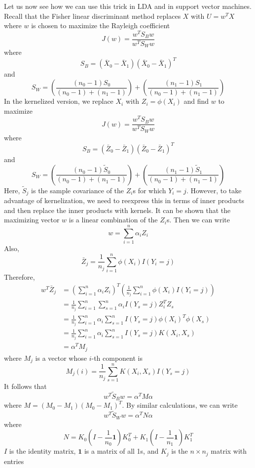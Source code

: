 Let us now see how we can use this trick in LDA and in support vector
machines.
Recall that the Fisher linear discriminant method replaces \(X\) with
\(U = w^T X\) where \(w\) is chosen to maximize the Rayleigh coefficient
\[
J(w) = \frac{w^T S_B w}{w^T S_W w}
\]
where
\[
S_B = (\bar{X}_{0} - \bar{X}_{1})(\bar{X}_{0} - \bar{X}_{1})^T
\]
and
\[
S_W = \left( \frac{(n_{0} - 1) S_{0}}{(n_{0} - 1) + (n_{1} - 1)} \right) + \left( \frac{(n_{1} - 1) S_{1}}{(n_{0} - 1) + (n_{1} - 1)} \right)
\]
In the kernelized version, we replace \(X_{i}\) with \(Z_{i} = \phi(X_{i})\)
and find \(w\) to maximize
\[
J(w) = \frac{w^T S_B w}{w^T S_W w}
\]
where
\[
S_B = (\bar{Z}_{0} - \bar{Z}_{1})(\bar{Z}_{0} - \bar{Z}_{1})^T
\]
and
\[
S_W = \left( \frac{(n_{0} - 1) \tilde{S}_{0}}{(n_{0} - 1) + (n_{1} - 1)} \right) + \left( \frac{(n_{1} - 1) \tilde{S}_{1}}{(n_{0} - 1) + (n_{1} - 1)} \right)
\]
Here, \(\tilde{S}_{j}\) is the sample covariance of the \(Z_{i}\)s for
which \(Y_{i} = j\). However, to take advantage of kernelization, we need
to reexpress this in terms of inner products and then replace the inner
products with kernels.
It can be shown that the maximizing vector \(w\) is a linear combination
of the \(Z_{i}\)s. Then we can write
\[
w = \sum_{i=1}^{n} \alpha_{i} Z_{i}
\]
Also,
\[
\bar{Z}_{j} = \frac{1}{n_{j}} \sum_{i=1}^{n} \phi(X_{i}) I(Y_{i} = j)
\]
Therefore,
\begin{align*}
w^T \bar{Z}_{j} &= \left( \sum_{i=1}^{n} \alpha_{i} Z_{i} \right)^T \left( \frac{1}{n_{j}} \sum_{i=1}^{n} \phi(X_{i}) I(Y_{i} = j) \right) \\
&= \frac{1}{n_{j}} \sum_{i=1}^{n} \sum_{s=1}^{n} \alpha_{i} I(Y_s = j) Z_{i}^T Z_s \\
&= \frac{1}{n_{j}} \sum_{i=1}^{n} \alpha_{i} \sum_{s=1}^{n} I(Y_s = j) \phi(X_{i})^T \phi(X_s) \\
&= \frac{1}{n_{j}} \sum_{i=1}^{n} \alpha_{i} \sum_{s=1}^{n} I(Y_s = j) K(X_{i}, X_s) \\
&= \alpha^T M_{j}
\end{align*}
where \(M_{j}\) is a vector whose \(i\)-th component is
\[
M_{j}(i) = \frac{1}{n_{j}} \sum_{s=1}^{n} K(X_{i}, X_s) I(Y_s = j)
\]
It follows that
\[
w^T \tilde{S}_B w = \alpha^T M \alpha
\]
where \(M = (M_{0} - M_{1})(M_{0} - M_{1})^T\). By similar calculations, we can
write
\[
w^T \tilde{S}_W w = \alpha^T N \alpha
\]
where
\[
N = K_{0}\left( I - \frac{1}{n_{0}}\mathbf{1}\right) K_{0}^T + K_{1}\left( I - \frac{1}{n_{1}}\mathbf{1}\right) K_{1}^T
\]
\(I\) is the identity matrix, \(\mathbf{1}\) is a matrix of all 1s, and
\(K_{j}\) is the \(n \times n_{j}\) matrix with entries

